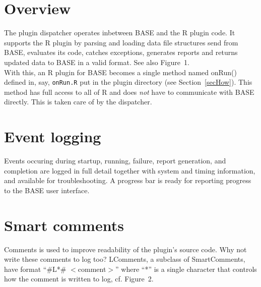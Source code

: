 \documentclass[portrait,plainsections]{sciposter}
\begin{document}
\begin{multicols}{3}
\begin{minipage}{\columnwidth}
\section{Overview}
The plugin dispatcher operates inbetween BASE and the R plugin code.
It supports the R plugin by parsing and loading data file structures 
send from BASE, evaluates its code, catches exceptions, generates reports 
and returns updated data to BASE in a valid format.
See also Figure~1.\\

With this, an R plugin for BASE becomes a single method named onRun() 
defined in, say, \texttt{onRun.R} put in the plugin directory (see Section~\ref{secHow}). 
This method has full access to all of R and does \emph{not} have to 
communicate with BASE directly.  This is taken care of by the dispatcher.
\end{minipage}


\begin{minipage}{\columnwidth}
\section{Event logging}
Events occuring during startup, running, failure, report generation, and completion are logged in full detail together with system and timing information, and available for troubleshooting.  A progress bar is ready for reporting progress to the BASE user interface.
\end{minipage}


\section{Smart comments}
Comments is used to improve readability of the plugin's source code.  Why not write these comments to log too?  LComments, a subclass of SmartComments, have format ``\#L*\# $<$comment$>$'' where ``*'' is a single character that controls how the comment is written to log, cf. Figure~2.\\


\end{multicols}
\end{document}

